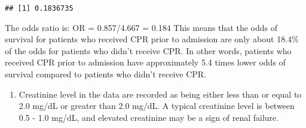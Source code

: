 \documentclass[
]{article}
\newenvironment{Shaded}{\begin{snugshade}}{\end{snugshade}}
\newcommand{\AttributeTok}[1]{\textcolor[rgb]{0.13,0.29,0.53}{#1}}
\newcommand{\CommentTok}[1]{\textcolor[rgb]{0.56,0.35,0.01}{\textit{#1}}}
\newcommand{\FunctionTok}[1]{\textcolor[rgb]{0.13,0.29,0.53}{\textbf{#1}}}
\newcommand{\NormalTok}[1]{#1}
\newcommand{\OtherTok}[1]{\textcolor[rgb]{0.56,0.35,0.01}{#1}}
\newcommand{\SpecialCharTok}[1]{\textcolor[rgb]{0.81,0.36,0.00}{\textbf{#1}}}
\newcommand{\StringTok}[1]{\textcolor[rgb]{0.31,0.60,0.02}{#1}}
\providecommand{\tightlist}{%
  \setlength{\itemsep}{0pt}\setlength{\parskip}{0pt}}
\begin{document}
\begin{Shaded}
\end{Shaded}

\begin{verbatim}
## [1] 0.1836735
\end{verbatim}

The odds ratio is: OR = 0.857/4.667 = 0.184 This means that the odds of
survival for patients who received CPR prior to admission are only about
18.4\% of the odds for patients who didn't receive CPR. In other words,
patients who received CPR prior to admission have approximately 5.4
times lower odds of survival compared to patients who didn't receive
CPR.

\begin{enumerate}
\def\labelenumi{\arabic{enumi}.}
\setcounter{enumi}{1}
\tightlist
\item
  Creatinine level in the data are recorded as being either less than or
  equal to 2.0 mg/dL or greater than 2.0 mg/dL. A typical creatinine
  level is between 0.5 - 1.0 mg/dL, and elevated creatinine may be a
  sign of renal failure.
\end{enumerate}

\begin{Shaded}
\end{Shaded}
\end{document}
